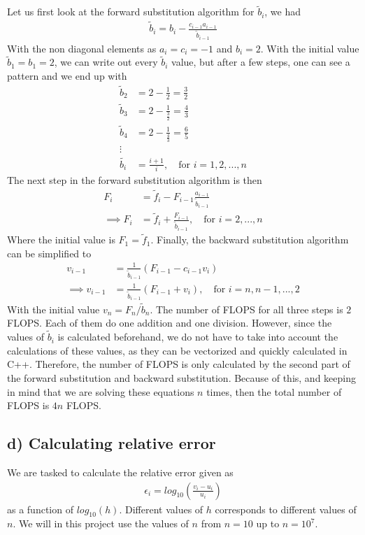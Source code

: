\documentclass[12pt]{article}
\begin{document}
Let us first look at the forward substitution algorithm for $\tilde{b}_i$, we had
\begin{align}
\tilde{b}_i = b_i - \frac{c_{i-1}a_{i-1}}{\tilde{b}_{i-1}}
\end{align}
With the non diagonal elements as $a_i = c_i = -1$ and $b_i = 2$. With the initial value $\tilde{b}_1 = b_1 = 2$, we can write out every $\tilde{b}_i$ value, but after a few steps, one can see a pattern and we end up with
\begin{align}
\tilde{b}_2 &= 2 - \frac{1}{2} = \frac{3}{2} \nonumber \\
\tilde{b}_3 &= 2 - \frac{1}{\frac{3}{2}} = \frac{4}{3} \nonumber \\
\tilde{b}_4 &= 2 - \frac{1}{\frac{4}{3}} = \frac{6}{5} \nonumber \\
\vdots \nonumber \\
\tilde{b_i} &= \frac{i+1}{i}, \quad \text{for } i = 1,2,...,n
\end{align}
The next step in the forward substitution algorithm is then
\begin{align}
F_i &= \tilde{f}_i - F_{i-1}\frac{a_{i-1}}{\tilde{b}_{i-1}}  \nonumber \\
\implies F_i &= \tilde{f}_i + \frac{F_{i-1}}{\tilde{b}_{i-1}}, \quad \text{for } i=2,...,n
\end{align}
Where the initial value is $F_1 = \tilde{f}_1$. Finally, the backward substitution algorithm can be simplified to
\begin{align}
v_{i-1} &= \frac{1}{\tilde{b}_{i-1}}(F_{i-1}-c_{i-1}v_i) \nonumber \\
\implies v_{i-1} &= \frac{1}{\tilde{b}_{i-1}}(F_{i-1} + v_i), \quad \text{for } i = n, n-1, ..., 2
\end{align}
With the initial value $v_{n} = F_n/\tilde{b}_n$. The number of FLOPS for all three steps is $2$ FLOPS. Each of them do one addition and one division. However, since the values of $\tilde{b}_i$ is calculated beforehand, we do not have to take into account the calculations of these values, as they can be vectorized and quickly calculated in C++. Therefore, the number of FLOPS is only calculated by the second part of the forward substitution and backward substitution. Because of this, and keeping in mind that we are solving these equations $n$ times, then the total number of FLOPS is $4n$ FLOPS.

\subsection*{d) Calculating relative error}
We are tasked to calculate the relative error given as
\begin{align*}
\epsilon_i = log_{10}\left(\frac{v_i - u_i}{u_i} \right)
\end{align*}
as a function of $log_{10}(h)$. Different values of $h$ corresponds to different values of $n$. We will in this project use the values of $n$ from $n=10$ up to $n=10^7$.
\end{document}

